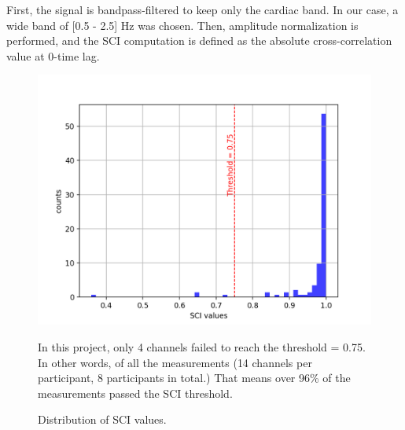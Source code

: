 First, the signal is bandpass-filtered to keep only the cardiac band. In our case, a wide band of [0.5 - 2.5] Hz was chosen. Then, amplitude normalization is performed, and the SCI computation is defined as the absolute cross-correlation value at 0-time lag.


\begin{figure}[H]
  \centering
    \includegraphics[scale=.75]{bilder/SCI_hist.png}
  \caption{Distribution of SCI values.}
   \label{fig:somesignal}
    \medskip
     \small {In this project, only 4 channels failed to reach the threshold = 0.75. In other words, of all the measurements (14 channels per participant, 8 participants in total.) That means over 96\% of the measurements passed the SCI threshold.}
 
\end{figure}




